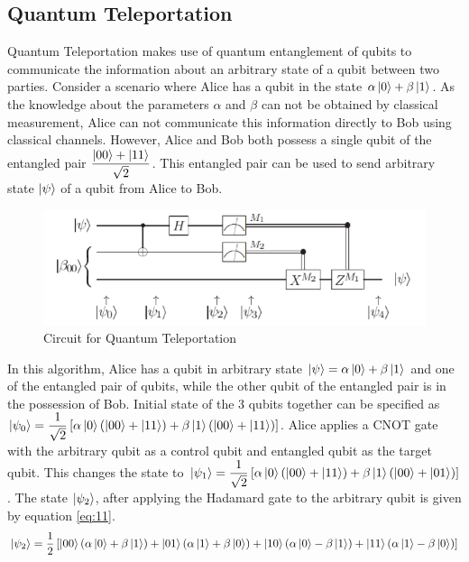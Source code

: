 \documentclass[english,a4paper,11pt,oneside,onecolumn]{book}
\begin{document}
\subsection{Quantum Teleportation}
\label{sec:qTele}
Quantum Teleportation makes use of quantum entanglement of qubits to communicate the information about an arbitrary state of a qubit between two parties. Consider a scenario where Alice has a qubit in the state \(\alpha\ket{0} + \beta\ket{1}\). As the knowledge about the parameters \(\alpha\) and \(\beta\) can not be obtained by classical measurement, Alice can not communicate this information directly to Bob using classical channels. However, Alice and Bob both possess a single qubit of the entangled pair \(\dfrac{\ket{00} + \ket{11}}{\sqrt{2}}\). This entangled pair can be used to send arbitrary state \(\ket{\psi}\) of a qubit from Alice to Bob.
\begin{figure}[H]
    \centering
    \includegraphics[scale=0.7]{Images/quantumTeleport.png}
    \caption{Circuit for Quantum Teleportation}
    \label{fig:qTelePort}
\end{figure}
\noindent In this algorithm, Alice has a qubit in arbitrary state \(\ket{\psi}=\alpha\ket{0} + \beta\ket{1}\) and one of the entangled pair of qubits, while the other qubit of the entangled pair is in the possession of Bob. Initial state of the 3 qubits together can be specified as \(\ket{\psi_0}=\dfrac{1}{\sqrt{2}}\left[\alpha\ket{0}\left(\ket{00}+\ket{11}\right)+\beta\ket{1}\left(\ket{00}+\ket{11}\right)\right]\). Alice applies a CNOT gate with the arbitrary qubit as a control qubit and entangled qubit as the target qubit. This changes the state to \(\ket{\psi_1}=\dfrac{1}{\sqrt{2}}\left[\alpha\ket{0}\left(\ket{00}+\ket{11}\right)+\beta\ket{1}\left(\ket{00}+\ket{01}\right)\right]\). The state \(\ket{\psi_2}\), after applying the Hadamard gate to the arbitrary qubit is given by equation \ref{eq:11}.
\begin{equation}\label{eq:11}
\ket{\psi_2}=\dfrac{1}{2}\left[\ket{00}\left(\alpha\ket{0}+\beta\ket{1}\right)+\ket{01}\left(\alpha\ket{1}+\beta\ket{0}\right)+\ket{10}\left(\alpha\ket{0}-\beta\ket{1}\right)+\ket{11}\left(\alpha\ket{1}-\beta\ket{0}\right)\right]
\end{equation}
\end{document}
